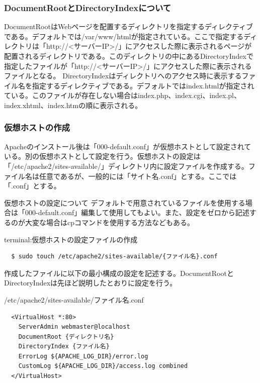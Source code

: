 \documentclass[a4paper, 11pt, dvipdfmx]{jsarticle}
\begin{document}
\subsubsection{DocumentRootとDirectoryIndexについて}
DocumentRootはWebページを配置するディレクトリを指定するディレクティブである。デフォルトでは/var/www/htmlが指定されている。ここで指定するディレクトリは「http://<サーバーIP>/」にアクセスした際に表示されるページが配置されるディレクトリである。このディレクトリの中にあるDirectoryIndexで指定したファイルが「http://<サーバーIP>/」にアクセスした際に表示されるファイルとなる。
DirectoryIndexはディレクトリへのアクセス時に表示するファイル名を指定するディレクティブである。デフォルトではindex.htmlが指定されている。このファイルが存在しない場合はindex.php、index.cgi、index.pl、index.xhtml、index.htmの順に表示される。

\subsubsection{仮想ホストの作成}
Apacheのインストール後は「000-default.conf」が仮想ホストとして設定されている。別の仮想ホストとして設定を行う。仮想ホストの設定は「/etc/apache2/sites-available/」ディレクトリ内に設定ファイルを作成する。ファイル名は任意であるが、一般的には「サイト名.conf」とする。ここでは「.conf」とする。
\begin{hosokubox}{仮想ホストの設定について}
  デフォルトで用意されているファイルを使用する場合は「000-default.conf」編集して使用してもよい。また、設定をゼロから記述するのが大変な場合はcpコマンドを使用する方法などもある。
\end{hosokubox}
\begin{commandbox}{terminal:仮想ホストの設定ファイルの作成}
  \begin{verbatim}
  $ sudo touch /etc/apache2/sites-available/{ファイル名}.conf\end{verbatim}
\end{commandbox}
作成したファイルに以下の最小構成の設定を記述する。DocumentRootとDirectoryIndexは先ほど説明したとおりに設定を行う。
\begin{commandbox}{/etc/apache2/sites-available/{ファイル名}.conf}
  \begin{verbatim}
  <VirtualHost *:80>
    ServerAdmin webmaster@localhost
    DocumentRoot {ディレクトリ名}
    DirectoryIndex {ファイル名}
    ErrorLog ${APACHE_LOG_DIR}/error.log
    CustomLog ${APACHE_LOG_DIR}/access.log combined
  </VirtualHost>\end{verbatim}
\end{commandbox}
\end{document}
